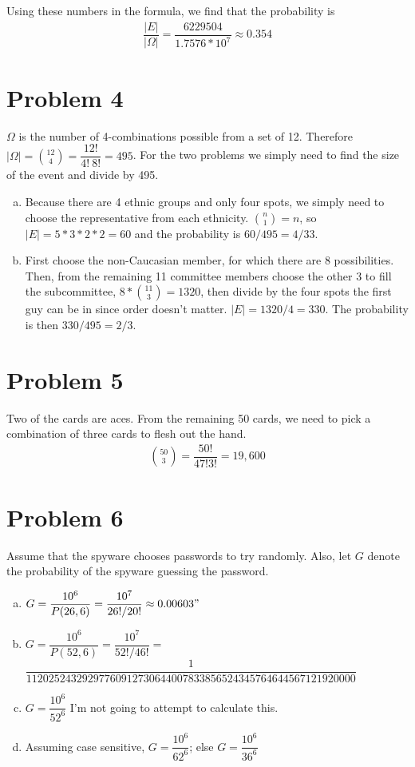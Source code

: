 \documentclass[11pt]{article}
\begin{document}
Using these numbers in the formula, we find that the probability is
	\begin{align*}
		\dfrac{|E|}{|\Omega|} = \dfrac{6229504}{1.7576 * 10^7} \approx 0 .354
	\end{align*}


\section*{Problem 4}
	$\Omega$ is the number of 4-combinations possible from a set of 12. Therefore $|\Omega| = \binom{12}{4} = \dfrac{12!}{4!\ 8!} = 495$. For the two problems we simply need to find the size of the event and divide by 495.
	
\begin{enumerate}[(a)]
	\item Because there are 4 ethnic groups and only four spots, we simply need to choose the representative from each ethnicity. $\binom{n}{1} = n$, so $|E| = 5*3*2*2 = 60$ and the probability is $60/495 = 4/33$.
	\item  First choose the non-Caucasian member, for which there are 8 possibilities. Then, from the remaining 11 committee members choose the other 3 to fill the subcommittee, $8 * \binom{11}{3} = 1320$, then divide by the four spots the first guy can be in since order doesn't matter. $|E| = 1320/4 = 330$. The probability is then $330/495 = 2/3$.
\end{enumerate}

\section*{Problem 5}
Two of the cards are aces. From the remaining 50 cards, we need to pick a combination of three cards to flesh out the hand.
\begin{align*}
	\binom{50}{3} = \dfrac{50!}{47!3!} =19,600
\end{align*}

\section*{Problem 6}
Assume that the spyware chooses passwords to try randomly. Also, let $G$ denote the probability of the spyware guessing the password.

\begin{enumerate}[(a)]
	\item $G = \dfrac{10^6}{P(26, 6)} = \dfrac{10^7}{26!/20!} \approx 0.00603"$
	\item $G = \dfrac{10^6}{P(52, 6)} = \dfrac{10^7}{52!/46!} =$\\
	$\dfrac{1}{11202524329297760912730644007833856524345764644567121920000}$
	\item $G = \dfrac{10^6}{52^6}$ I'm not going to attempt to calculate this.
	\item Assuming case sensitive, $G = \dfrac{10^6}{62^6}$; else $G = \dfrac{10^6}{36^6}$

	
\end{enumerate}
\end{document}
